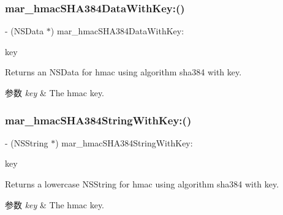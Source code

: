 \subsubsection{\texorpdfstring{mar\+\_\+hmac\+S\+H\+A384\+Data\+With\+Key\+:()}{mar\_hmacSHA384DataWithKey:()}}
{\footnotesize\ttfamily -\/ (N\+S\+Data $\ast$) mar\+\_\+hmac\+S\+H\+A384\+Data\+With\+Key\+: \begin{DoxyParamCaption}\item[{(N\+S\+Data $\ast$)}]{key }\end{DoxyParamCaption}}

Returns an N\+S\+Data for hmac using algorithm sha384 with key. 
\begin{DoxyParams}{参数}
{\em key} & The hmac key. \\
\hline
\end{DoxyParams}
\mbox{\label{category_n_s_data_07_m_a_r_e_x_08_a780c94fba74c2f5c87a7aecb79ccd60a}} 
\subsubsection{\texorpdfstring{mar\+\_\+hmac\+S\+H\+A384\+String\+With\+Key\+:()}{mar\_hmacSHA384StringWithKey:()}}
{\footnotesize\ttfamily -\/ (N\+S\+String $\ast$) mar\+\_\+hmac\+S\+H\+A384\+String\+With\+Key\+: \begin{DoxyParamCaption}\item[{(N\+S\+String $\ast$)}]{key }\end{DoxyParamCaption}}

Returns a lowercase N\+S\+String for hmac using algorithm sha384 with key. 
\begin{DoxyParams}{参数}
{\em key} & The hmac key. \\
\hline
\end{DoxyParams}
\mbox{\label{category_n_s_data_07_m_a_r_e_x_08_ad52d40f5420c0d16e76b2b01be5afd44}} 
